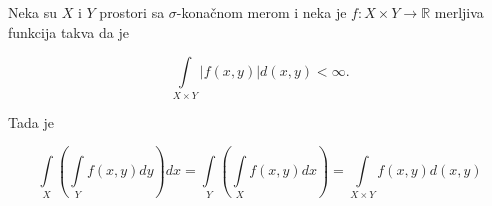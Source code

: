 \documentclass[11pt]{article}
\newcommand{\R}{\mathbb{R}}
\begin{document}
	\noindent
	Neka su $ X $ i $ Y $ prostori sa $ \sigma $-kona\v cnom merom i neka je $ f \colon X \times Y \rightarrow \R $ merljiva funkcija takva da je

	\begin{equation*}
		\int\limits_{X \times Y} |f(x, y)| d(x, y) < \infty.
	\end{equation*}

	\noindent
	Tada je

	\begin{equation*}
		\int\limits_X \left( \int\limits_Y f(x, y) dy \right) dx = \int\limits_Y \left( \int\limits_X f(x, y) dx \right) = \int\limits_{X \times Y} f(x, y) d(x, y)
	\end{equation*}
\end{document}
